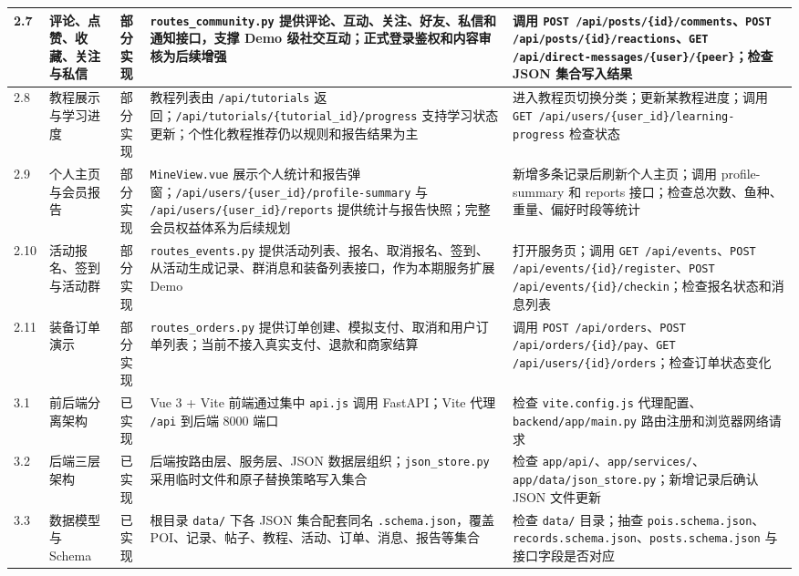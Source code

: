 \begin{longtable}{|p{0.6cm}|p{3.0cm}|p{1.7cm}|p{5.4cm}|p{3.7cm}|}
  \hline
  2.7 & 评论、点赞、收藏、关注与私信 & 部分实现 & \texttt{routes\_community.py} 提供评论、互动、关注、好友、私信和通知接口，支撑 Demo 级社交互动；正式登录鉴权和内容审核为后续增强 & 调用 \texttt{POST /api/posts/\{id\}/comments}、\texttt{POST /api/posts/\{id\}/reactions}、\texttt{GET /api/direct-messages/\{user\}/\{peer\}}；检查 JSON 集合写入结果 \\
  \hline
  2.8 & 教程展示与学习进度 & 部分实现 & 教程列表由 \texttt{/api/tutorials} 返回；\texttt{/api/tutorials/\{tutorial\_id\}/progress} 支持学习状态更新；个性化教程推荐仍以规则和报告结果为主 & 进入教程页切换分类；更新某教程进度；调用 \texttt{GET /api/users/\{user\_id\}/learning-progress} 检查状态 \\
  \hline
  2.9 & 个人主页与会员报告 & 部分实现 & \texttt{MineView.vue} 展示个人统计和报告弹窗；\texttt{/api/users/\{user\_id\}/profile-summary} 与 \texttt{/api/users/\{user\_id\}/reports} 提供统计与报告快照；完整会员权益体系为后续规划 & 新增多条记录后刷新个人主页；调用 profile-summary 和 reports 接口；检查总次数、鱼种、重量、偏好时段等统计 \\
  \hline
  2.10 & 活动报名、签到与活动群 & 部分实现 & \texttt{routes\_events.py} 提供活动列表、报名、取消报名、签到、从活动生成记录、群消息和装备列表接口，作为本期服务扩展 Demo & 打开服务页；调用 \texttt{GET /api/events}、\texttt{POST /api/events/\{id\}/register}、\texttt{POST /api/events/\{id\}/checkin}；检查报名状态和消息列表 \\
  \hline
  2.11 & 装备订单演示 & 部分实现 & \texttt{routes\_orders.py} 提供订单创建、模拟支付、取消和用户订单列表；当前不接入真实支付、退款和商家结算 & 调用 \texttt{POST /api/orders}、\texttt{POST /api/orders/\{id\}/pay}、\texttt{GET /api/users/\{id\}/orders}；检查订单状态变化 \\
  \hline
  3.1 & 前后端分离架构 & 已实现 & Vue 3 + Vite 前端通过集中 \texttt{api.js} 调用 FastAPI；Vite 代理 \texttt{/api} 到后端 8000 端口 & 检查 \texttt{vite.config.js} 代理配置、\texttt{backend/app/main.py} 路由注册和浏览器网络请求 \\
  \hline
  3.2 & 后端三层架构 & 已实现 & 后端按路由层、服务层、JSON 数据层组织；\texttt{json\_store.py} 采用临时文件和原子替换策略写入集合 & 检查 \texttt{app/api/}、\texttt{app/services/}、\texttt{app/data/json\_store.py}；新增记录后确认 JSON 文件更新 \\
  \hline
  3.3 & 数据模型与 Schema & 已实现 & 根目录 \texttt{data/} 下各 JSON 集合配套同名 \texttt{.schema.json}，覆盖 POI、记录、帖子、教程、活动、订单、消息、报告等集合 & 检查 \texttt{data/} 目录；抽查 \texttt{pois.schema.json}、\texttt{records.schema.json}、\texttt{posts.schema.json} 与接口字段是否对应 \\

\end{longtable}
